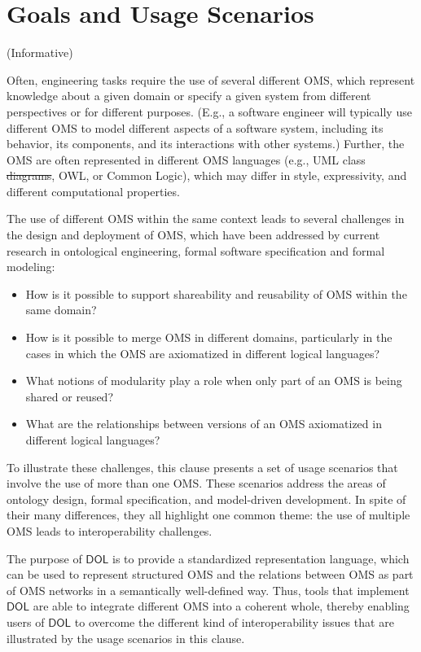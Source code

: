 \documentclass[10pt,fleqn,final]{scrreprt}
\newcommand*{\DOL}{\ensuremath{\mathsf{DOL}}\xspace}
\newcommand{\informative}[0]{{\begin{center}{\Large{(Informative})}\end{center}} \bigskip}
\newcommand{\clauseI}[1]{\chapter{#1} \informative }
\providecommand{\DIFadd}[1]{{\protect\color{blue}\uwave{#1}}} %
\providecommand{\DIFdel}[1]{{\protect\color{red}\sout{#1}}}                      %
\providecommand{\DIFaddbegin}{} %
\providecommand{\DIFaddend}{} %
\providecommand{\DIFdelbegin}{} %
\providecommand{\DIFdelend}{} %
\begin{document}

\clauseI{Goals and Usage Scenarios} \label{c:goal}


Often, engineering tasks require the use of several different OMS, which represent knowledge about 
a given domain or specify a given system from different perspectives or for different purposes.
(E.g., a software engineer will typically use different OMS to model different aspects of a software
 system,  including its behavior, its components, and its interactions with other systems.)  Further, the OMS are often represented in different OMS languages (e.g., UML class \DIFdelbegin \DIFdel{diagrams}\DIFdelend \DIFaddbegin \DIFadd{models}\DIFaddend , OWL, or Common Logic), which may differ in style, expressivity, and different computational properties. 

The use of different OMS within the same context leads to  several 
challenges in the design and deployment of OMS, which have been addressed by current research in 
ontological engineering, formal software specification and formal modeling:
\begin{itemize}
\item How is it possible to support shareability and reusability of OMS within the same domain?
\item How is it possible to merge OMS in different domains, particularly in the cases 
in which the OMS are axiomatized in different logical languages?
\item What notions of modularity play a role when only part of an OMS is being shared or reused?
\item What are the relationships between versions of an OMS axiomatized in different logical languages?
\end{itemize}


To illustrate these challenges, this clause presents a set of usage scenarios that involve the use of more than one OMS. These scenarios address the areas of ontology design, formal specification, and model-driven development. In spite of their many differences, they  all highlight one common theme:  
 the use of multiple OMS leads to interoperability challenges. 


The purpose of \DOL is to provide  a
standardized representation language, which can be used to represent structured OMS and the relations 
between OMS as part of OMS networks in a semantically well-defined way. Thus, tools that implement \DOL are able to integrate different OMS into a coherent whole, thereby enabling users of \DOL to overcome the different kind of interoperability issues that are illustrated by the usage scenarios in this clause.  
\end{document}
